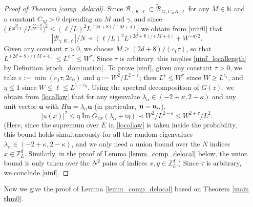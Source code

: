 \documentclass{article}
\newcommand{\1}{\mathds{1}}
\numberwithin{equation}{section}
\newcommand{\bu}{{\bf{u}}}
\newcommand{\al}{\alpha}
\newcommand{\e}{{\varepsilon}}
\newcommand{\wt}{\widetilde}
\newcommand{\ii}{\mathrm{i}} %
\renewcommand{\leq}{\leqslant}
\renewcommand{\geq}{\geqslant}
\renewcommand{\le}{\leq}
\renewcommand{\ge}{\geq}
\newcommand{\N}{\mathbb{N}}
\newcommand{\Z}{\mathbb{Z}}
\DeclareMathOperator{\im}{Im}
\theoremstyle{plain} %
\theoremstyle{remark}
\begin{document}
\begin{proof}[Proof of Theorem \ref{comp_delocal}]
	Since ${\mathcal B}_{\gamma,K,\ell}\subset \wt{\mathcal B}_{M, C_M K,\ell}$ for any $M\in \N$ and a constant $C_M>0$ depending on $M$ and $\gamma$, and since $\big(  {\ell^{\frac{M}{M+4}}}/{L^{\frac{M-d}{M+4}}}\big)^2\le (\ell/L)^2L^{(2d+8)/(M+4)}$, we obtain from \eqref{uinf0} that
	$$ {|\mathcal B_{\gamma,K,\ell}|}/{N}\prec  \left( {\ell}/{L}\right)^2 L^{(2d+8)/(M+4)} + W^{-d/2}.$$
	Given any constant $\tau>0$, we choose $M\ge (2d+8)/(c_1\tau)$, so that $L^{(2d+8)/(M+4)}\le L^{c_1\tau}\le W^{\tau}$. Since $\tau$ is arbitrary, this implies \eqref{uinf_locallength} by Definition \ref{stoch_domination}. To prove \eqref{uinf}, given any constant $\tau>0$, we take $\e:=\min(c_1\tau, 2c_0)$ and $\eta := W^{2}/L^{2-\e}$; then $L^\e\le W^{\tau}$ since $W\ge L^{c_1}$, and $\eta\le 1$ since $W\le \ell\le L^{1-c_0}$. Using the spectral decomposition of $G(z)$, we obtain from \eqref{locallaw} that for any eigenvalue $\lambda_\al\in (-2+\kappa,2-\kappa)$ and any unit vector $\mathbf u$ with $H\mathbf u=\lambda_\al \mathbf u$ (in particular, $\mathbf u=\bu_\al$),
	$$| u(x)|^2 \le \eta \im G_{xx}(\lambda_\al +\ii \eta) \prec  W^{2}/L^{2-\e}\le W^{2+\tau}/L^2 .$$
	(Here, since the supremum over $E$ in \eqref{locallaw} is taken inside the probability, this bound holds simultaneously for all the random eigenvalues $\lambda_\al\in (-2+\kappa,2-\kappa)$, and we only need a union bound over the $N$ indices $x\in \Z_L^d$. Similarly, in the proof of Lemma \ref{lemm_comp_delocal} below, the union bound is only taken over the $N^2$ pairs of indices $x,y\in \Z_L^d$.) Since $\tau$ is arbitrary, we conclude \eqref{uinf}.
\end{proof}

Now we give the proof of Lemma \ref{lemm_comp_delocal} based on Theorem \ref{main thm0}.
\end{document}

